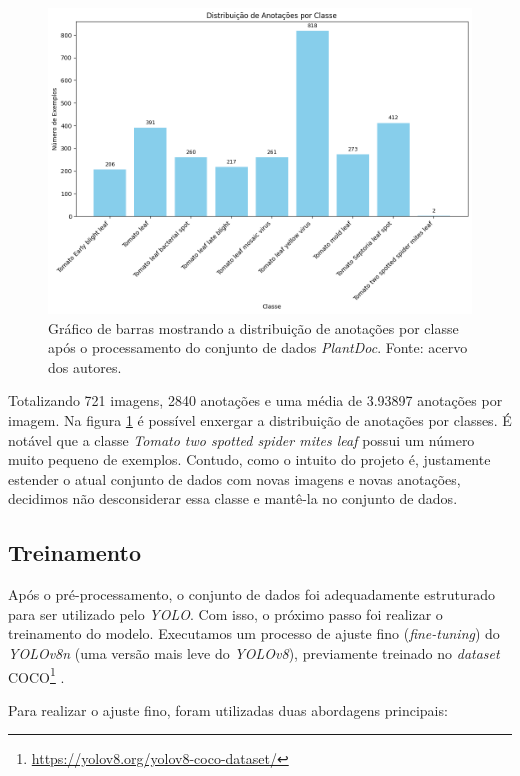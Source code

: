 \begin{figure}[htb!]
    \centering
    \includegraphics[width=1\linewidth]{images/distribuicao_anotacoes.png}
    \caption{\label{fig:distribuicao-ann-cls} Gráfico de barras mostrando a distribuição de anotações por classe após o processamento do conjunto de dados \emph{PlantDoc}. Fonte: acervo dos autores.}
\end{figure}

Totalizando 721 imagens, 2840 anotações e uma média de 3.93897 anotações por imagem. Na figura \ref{fig:distribuicao-ann-cls} é possível enxergar a distribuição de anotações por classes. É notável que a classe \emph{Tomato two spotted spider mites leaf} possui um número muito pequeno de exemplos. Contudo, como o intuito do projeto é, justamente estender o atual conjunto de dados com novas imagens e novas anotações, decidimos não desconsiderar essa classe e mantê-la no conjunto de dados.

\subsection{Treinamento}
\label{sec:treinamento2}
Após o pré-processamento, o conjunto de dados foi adequadamente estruturado para ser utilizado pelo \emph{YOLO}. Com isso, o próximo passo foi realizar o treinamento do modelo. Executamos um processo de ajuste fino (\emph{fine-tuning}) do \emph{YOLOv8n} (uma versão mais leve do \emph{YOLOv8}), previamente treinado no \emph{dataset} COCO\footnote{\url{https://yolov8.org/yolov8-coco-dataset/}} \cite{COCO}.

Para realizar o ajuste fino, foram utilizadas duas abordagens principais:

